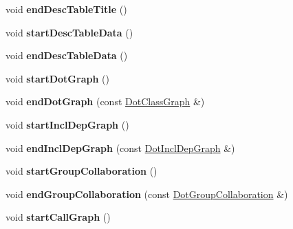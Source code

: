 \begin{DoxyCompactItemize}
\mbox{\label{class_man_generator_a27152804f9384ad60557157f5e5be5da}} 
void {\bfseries end\+Desc\+Table\+Title} ()
\item 
\mbox{\label{class_man_generator_a1a7710a1e0c3c53a8729bda81863addc}} 
void {\bfseries start\+Desc\+Table\+Data} ()
\item 
\mbox{\label{class_man_generator_a98fcb779ebc649bc817dc7ce7fd53caf}} 
void {\bfseries end\+Desc\+Table\+Data} ()
\item 
\mbox{\label{class_man_generator_a0b197f55abd7fe194183ecee7aebe800}} 
void {\bfseries start\+Dot\+Graph} ()
\item 
\mbox{\label{class_man_generator_aedc67f1074ac8e6281c395700bf6e9e5}} 
void {\bfseries end\+Dot\+Graph} (const \mbox{\hyperlink{class_dot_class_graph}{Dot\+Class\+Graph}} \&)
\item 
\mbox{\label{class_man_generator_a6c38d1f8f00d0cf2c5c69417e54aa446}} 
void {\bfseries start\+Incl\+Dep\+Graph} ()
\item 
\mbox{\label{class_man_generator_afb39cce552d143492bd625cd0a0dd0dc}} 
void {\bfseries end\+Incl\+Dep\+Graph} (const \mbox{\hyperlink{class_dot_incl_dep_graph}{Dot\+Incl\+Dep\+Graph}} \&)
\item 
\mbox{\label{class_man_generator_a0e3edd731a18f4410530e8e32bbabb4f}} 
void {\bfseries start\+Group\+Collaboration} ()
\item 
\mbox{\label{class_man_generator_ac3c761549d50b8dc14ca497ab9b319e8}} 
void {\bfseries end\+Group\+Collaboration} (const \mbox{\hyperlink{class_dot_group_collaboration}{Dot\+Group\+Collaboration}} \&)
\item 
\mbox{\label{class_man_generator_ace53641e16c7bf64fbddc79178e6fc52}} 
void {\bfseries start\+Call\+Graph} ()
\item 
\mbox{\label{class_man_generator_afe6604d384542e566b828739a2c683cd}} 

\end{DoxyCompactItemize}
